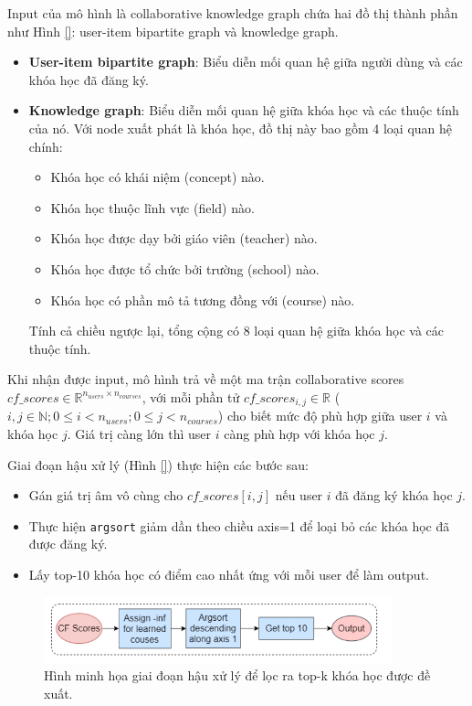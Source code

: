 Input của mô hình là collaborative knowledge graph chứa hai đồ thị thành phần như Hình \ref{}: user-item bipartite graph và knowledge graph. 
\begin{itemize}
    \item \textbf{User-item bipartite graph}: Biểu diễn mối quan hệ giữa người dùng và các khóa học đã đăng ký. 
    \item \textbf{Knowledge graph}: Biểu diễn mối quan hệ giữa khóa học và các thuộc tính của nó. Với node xuất phát là khóa học, đồ thị này bao gồm 4 loại quan hệ chính:
    \begin{itemize}
        \item Khóa học có khái niệm (concept) nào.
        \item Khóa học thuộc lĩnh vực (field) nào.
        \item Khóa học được dạy bởi giáo viên (teacher) nào.
        \item Khóa học được tổ chức bởi trường (school) nào.
        \item Khóa học có phần mô tả tương đồng với (course) nào.
    \end{itemize}
    Tính cả chiều ngược lại, tổng cộng có 8 loại quan hệ giữa khóa học và các thuộc tính.
\end{itemize}

Khi nhận được input, mô hình trả về một ma trận collaborative scores $cf\_scores \in \mathbb{R}^{n_{users} \times n_{courses}}$, với mỗi phần tử $cf\_scores_{i,j} \in \mathbb{R}$ ($i,j \in \mathbb{N}; 0 \leq i < n_{users}; 0 \leq j < n_{courses}$) cho biết mức độ phù hợp giữa user $i$ và khóa học $j$. Giá trị càng lớn thì user $i$ càng phù hợp với khóa học $j$.

Giai đoạn hậu xử lý (Hình \ref{}) thực hiện các bước sau:
\begin{itemize}
    \item Gán giá trị âm vô cùng cho $cf\_scores[i,j]$ nếu user $i$ đã đăng ký khóa học $j$.
    \item Thực hiện \texttt{argsort} giảm dần theo chiều axis=1 để loại bỏ các khóa học đã được đăng ký.
    \item Lấy top-10 khóa học có điểm cao nhất ứng với mỗi user để làm output.
\end{itemize}

\begin{figure}[H]
    \centering
    \includegraphics[width=0.9\textwidth]{figures/70.png}
    \caption{Hình minh họa giai đoạn hậu xử lý để lọc ra top-k khóa học được đề xuất.}
    \label{fig:hinh4_2}
\end{figure}


